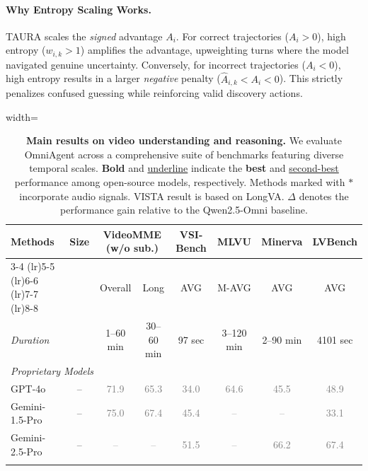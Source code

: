 \documentclass{article}
\theoremstyle{plain}
\theoremstyle{definition}
\theoremstyle{remark}
\newcommand{\gv}[1]{\textcolor{gray}{#1}}
\begin{document}
\paragraph{Why Entropy Scaling Works.}
TAURA scales the \textit{signed} advantage $A_i$. For correct trajectories ($A_i > 0$), high entropy ($w_{i,k} > 1$) amplifies the advantage, upweighting turns where the model navigated genuine uncertainty. Conversely, for incorrect trajectories ($A_i < 0$), high entropy results in a larger \textit{negative} penalty ($\hat{A}_{i,k} < A_{i} < 0$). This strictly penalizes confused guessing while reinforcing valid discovery actions.


\begin{table}[t]
\caption{\textbf{Main results on video understanding and reasoning.} We evaluate OmniAgent across a comprehensive suite of benchmarks featuring diverse temporal scales. \textbf{Bold} and \underline{underline} indicate the \textbf{best} and \underline{second-best} performance among open-source models, respectively. Methods marked with $*$ incorporate audio signals. VISTA result is based on LongVA. $\Delta$ denotes the performance gain relative to the Qwen2.5-Omni baseline.}
\label{tab:main-results}
\vspace{-2mm}
\begin{center}
\begin{normalsize} 
\begin{adjustbox}{width=\textwidth}
\setlength{\tabcolsep}{8pt} 
\renewcommand{\arraystretch}{1.1} 
\begin{tabular}{l c cc cccc}
\toprule
\multirow{3}{*}{\textbf{Methods}} & 
\multirow{3}{*}{\textbf{Size}} & \multicolumn{2}{c}{\textbf{VideoMME (w/o sub.)}} & \textbf{VSI-Bench} & \textbf{MLVU} & \textbf{Minerva} & \textbf{LVBench} \\
\cmidrule(lr){3-4} \cmidrule(lr){5-5} \cmidrule(lr){6-6} \cmidrule(lr){7-7} \cmidrule(lr){8-8}

& & Overall & Long & AVG & M-AVG & AVG & AVG \\
\midrule

\textit{Duration} & &  1--60 min &  30--60 min &  97 sec &  3--120 min &  2--90 min &  4101 sec \\
\midrule

\multicolumn{8}{l}{\textit{Proprietary Models}} \\
GPT-4o~\cite{gpt4o} & -- & \gv{71.9} & \gv{65.3} & \gv{34.0} & \gv{64.6} & \gv{45.5} & \gv{48.9} \\
Gemini-1.5-Pro~\cite{team2024gemini} & -- & \gv{75.0} & \gv{67.4} & \gv{45.4} & \gv{--} & \gv{--} & \gv{33.1} \\
Gemini-2.5-Pro~\cite{comanici2025gemini} & -- & \gv{--} & \gv{--} & \gv{51.5} & \gv{--} & \gv{66.2} & \gv{67.4} \\
\midrule \addlinespace[0.2em]


\end{tabular}
\end{adjustbox}
\end{normalsize}
\end{center}
\end{table}
\end{document}
